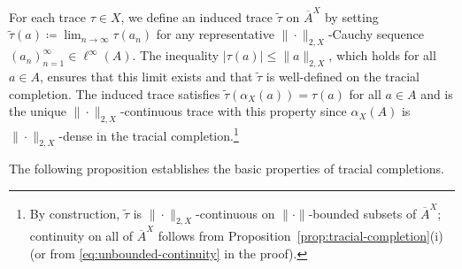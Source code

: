 \documentclass[a4paper,11pt]{amsart}
\theoremstyle{definition}
\numberwithin{equation}{section}
\numberwithin{theorem}{section}
\newcommand{\completion}[2]{\overline{#1}^{#2}}
\begin{document}
For each trace $\tau \in X$, we define an induced trace $\widetilde{\tau}$ on $\completion{A}{X}$ by setting $\widetilde{\tau}(a)\coloneqq \lim_{n\rightarrow\infty}\tau(a_n)$ for any representative $\|\cdot\|_{2,X}$-Cauchy sequence $(a_n)_{n=1}^\infty \in \ell^\infty(A)$. The inequality $|\tau(a)| \leq \|a\|_{2,X}$, which holds for all $a \in A$, ensures that this limit exists and that $\widetilde{\tau}$ is well-defined on the tracial completion. The induced trace satisfies $\widetilde{\tau}(\alpha_X(a)) = \tau(a)$  for all $a \in A$ and is the unique $\|\cdot\|_{2,X}$-continuous trace with this property since $\alpha_X(A)$ is $\|\cdot\|_{2,X}$-dense in the tracial completion.\footnote{By construction, $\widetilde\tau$ is $\|\cdot\|_{2, X}$-continuous on $\|\cdot\|$-bounded subsets of $\completion{A}{X}$;  continuity on all of $\completion{A}{X}$ follows from Proposition~\ref{prop:tracial-completion}(i) (or from \eqref{eq:unbounded-continuity} in the proof).}

The following proposition establishes the basic properties of tracial completions.
\end{document}
